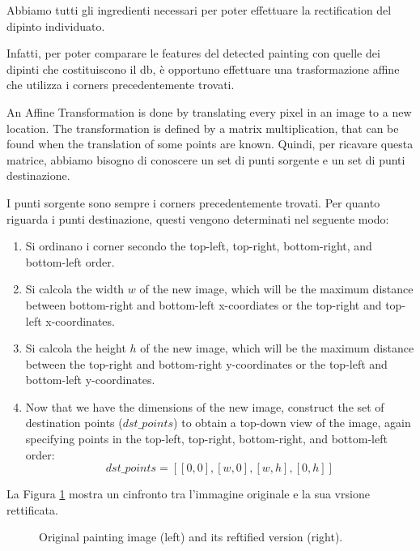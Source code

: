 \documentclass[10pt,twocolumn,letterpaper]{article}
\begin{document}
Abbiamo tutti gli ingredienti necessari per poter effettuare la rectification del dipinto individuato. 

Infatti, per poter comparare le features del detected painting con quelle dei dipinti che costituiscono il db, è opportuno effettuare una trasformazione affine che utilizza i corners precedentemente trovati.

An Affine Transformation is done by translating every pixel in an image to a new location. The transformation is defined by a matrix multiplication, that can be found when the translation of some points are known. Quindi, per ricavare questa matrice, abbiamo bisogno di conoscere un set di punti sorgente e un set di punti destinazione.

I punti sorgente sono sempre i corners precedentemente trovati. Per quanto riguarda i punti destinazione, questi vengono determinati nel seguente modo:
\begin{enumerate}
   \item Si ordinano i corner secondo the top-left, top-right, bottom-right, and bottom-left order. 
   
   \item Si calcola the width $w$ of the new image, which will be the
   maximum distance between bottom-right and bottom-left x-coordiates or the top-right and top-left x-coordinates. 
   
   \item Si calcola the height $h$ of the new image, which will be the maximum distance between the top-right and bottom-right y-coordinates or the top-left and bottom-left y-coordinates. 
   
   \item Now that we have the dimensions of the new image, construct the set of destination points ($dst\_points$) to obtain a top-down view of the image, again specifying points in the top-left, top-right, bottom-right, and bottom-left order:
   \begin{equation}
      dst\_points = [[0, 0], [w, 0], [w, h], [0, h]]
      \label{eq:1}
   \end{equation}
\end{enumerate}


La Figura \ref{fig:rectifyComparison} mostra un cinfronto tra l'immagine originale e la sua vrsione rettificata.

\begin{figure}[t]
   \begin{center}
   \fbox{\rule{0pt}{2in} \rule{0.9\linewidth}{0pt}}
   \end{center}
      \caption{Original painting image (left) and its reftified version (right).}
   \label{fig:rectifyComparison}
\end{figure}
\end{document}

